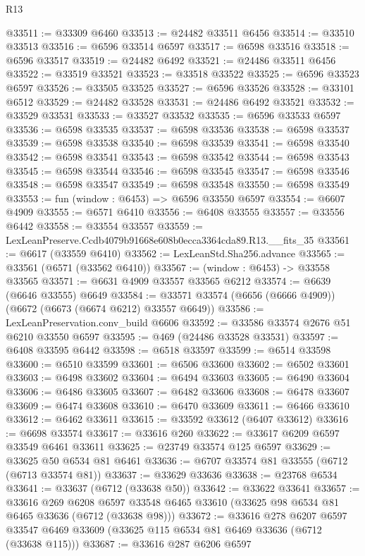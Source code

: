 \begin{lexlean}{R13}
\begin{coremodule}
@33511 := @33309 @6460
@33513 := @24482 @33511 @6456
@33514 := @33510 @33513
@33516 := @6596 @33514 @6597
@33517 := @6598 @33516
@33518 := @6596 @33517
@33519 := @24482 @6492
@33521 := @24486 @33511 @6456
@33522 := @33519 @33521
@33523 := @33518 @33522
@33525 := @6596 @33523 @6597
@33526 := @33505 @33525
@33527 := @6596 @33526
@33528 := @33101 @6512
@33529 := @24482 @33528
@33531 := @24486 @6492 @33521
@33532 := @33529 @33531
@33533 := @33527 @33532
@33535 := @6596 @33533 @6597
@33536 := @6598 @33535
@33537 := @6598 @33536
@33538 := @6598 @33537
@33539 := @6598 @33538
@33540 := @6598 @33539
@33541 := @6598 @33540
@33542 := @6598 @33541
@33543 := @6598 @33542
@33544 := @6598 @33543
@33545 := @6598 @33544
@33546 := @6598 @33545
@33547 := @6598 @33546
@33548 := @6598 @33547
@33549 := @6598 @33548
@33550 := @6598 @33549
@33553 := fun (window : @6453) => @6596 @33550 @6597
@33554 := @6607 @4909
@33555 := @6571 @6410
@33556 := @6408 @33555
@33557 := @33556 @6442
@33558 := @33554 @33557
@33559 := LexLeanPreserve.Ccdb4079b91668e608b0ecca3364cda89.R13.__fits_35
@33561 := @6617 (@33559 @6410)
@33562 := LexLeanStd.Sha256.advance
@33565 := @33561 (@6571 (@33562 @6410))
@33567 := (window : @6453) -> @33558 @33565
@33571 := @6631 @4909 @33557 @33565 @6212
@33574 := @6639 (@6646 @33555) @6649
@33584 := @33571 @33574 (@6656 (@6666 @4909)) (@6672 (@6673 (@6674 @6212) @33557 @6649))
@33586 := LexLeanPreservation.conv_build @6606
@33592 := @33586 @33574 @2676 @51 @6210 @33550 @6597
@33595 := @469 (@24486 @33528 @33531)
@33597 := @6408 @33595 @6442
@33598 := @6518 @33597
@33599 := @6514 @33598
@33600 := @6510 @33599
@33601 := @6506 @33600
@33602 := @6502 @33601
@33603 := @6498 @33602
@33604 := @6494 @33603
@33605 := @6490 @33604
@33606 := @6486 @33605
@33607 := @6482 @33606
@33608 := @6478 @33607
@33609 := @6474 @33608
@33610 := @6470 @33609
@33611 := @6466 @33610
@33612 := @6462 @33611
@33615 := @33592 @33612 (@6407 @33612)
@33616 := @6698 @33574
@33617 := @33616 @260
@33622 := @33617 @6209 @6597 @33549 @6461 @33611
@33625 := @23749 @33574 @125 @6597
@33629 := @33625 @50 @6534 @81 @6461
@33636 := @6707 @33574 @81 @33555 (@6712 (@6713 @33574 @81))
@33637 := @33629 @33636
@33638 := @23768 @6534
@33641 := @33637 (@6712 (@33638 @50))
@33642 := @33622 @33641
@33657 := @33616
    @269
    @6208
    @6597
    @33548
    @6465
    @33610
    (@33625 @98 @6534 @81 @6465 @33636 (@6712 (@33638 @98)))
@33672 := @33616
    @278
    @6207
    @6597
    @33547
    @6469
    @33609
    (@33625 @115 @6534 @81 @6469 @33636 (@6712 (@33638 @115)))
@33687 := @33616
    @287
    @6206
    @6597

\end{coremodule}
\end{lexlean}
